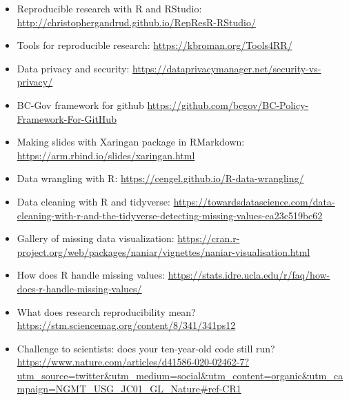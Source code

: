 \documentclass[]{book}
\providecommand{\tightlist}{%
  \setlength{\itemsep}{0pt}\setlength{\parskip}{0pt}}
\begin{document}
\begin{itemize}
\tightlist
\item
  Reproducible research with R and RStudio: \url{http://christophergandrud.github.io/RepResR-RStudio/}
\item
  Tools for reproducible research: \url{https://kbroman.org/Tools4RR/}
\item
  Data privacy and security: \url{https://dataprivacymanager.net/security-vs-privacy/}
\item
  BC-Gov framework for github \url{https://github.com/bcgov/BC-Policy-Framework-For-GitHub}
\item
  Making slides with Xaringan package in RMarkdown: \url{https://arm.rbind.io/slides/xaringan.html}
\item
  Data wrangling with R: \url{https://cengel.github.io/R-data-wrangling/}
\item
  Data cleaning with R and tidyverse: \url{https://towardsdatascience.com/data-cleaning-with-r-and-the-tidyverse-detecting-missing-values-ea23c519bc62}
\item
  Gallery of missing data visualization: \url{https://cran.r-project.org/web/packages/naniar/vignettes/naniar-visualisation.html}
\item
  How does R handle missing values: \url{https://stats.idre.ucla.edu/r/faq/how-does-r-handle-missing-values/}
\item
  What does research reproducibility mean? \url{https://stm.sciencemag.org/content/8/341/341ps12}
\item
  Challenge to scientists: does your ten-year-old code still run? \url{https://www.nature.com/articles/d41586-020-02462-7?utm_source=twitter\&utm_medium=social\&utm_content=organic\&utm_campaign=NGMT_USG_JC01_GL_Nature\#ref-CR1}
\end{itemize}
\end{document}
